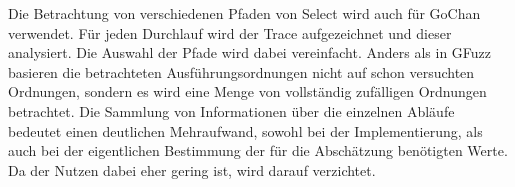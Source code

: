 Die Betrachtung von verschiedenen Pfaden von Select wird auch für GoChan 
verwendet. Für jeden Durchlauf wird 
der Trace aufgezeichnet und dieser
analysiert. Die Auswahl der Pfade wird dabei vereinfacht. Anders als 
in GFuzz basieren die betrachteten Ausführungsordnungen nicht auf schon versuchten Ordnungen,
sondern es wird eine Menge von vollständig zufälligen Ordnungen betrachtet.
Die Sammlung von Informationen über die einzelnen Abläufe bedeutet einen 
deutlichen Mehraufwand, sowohl bei der Implementierung, als auch bei der eigentlichen 
Bestimmung der für die Abschätzung benötigten Werte. Da der Nutzen dabei eher gering ist,
wird darauf verzichtet.